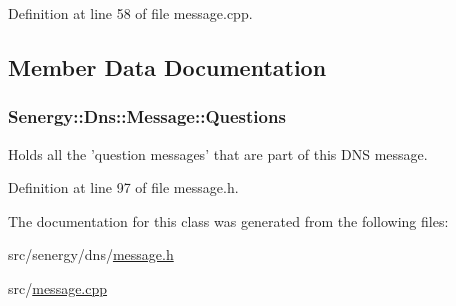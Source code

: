 Definition at line 58 of file message.\-cpp.



\subsection{Member Data Documentation}
\hypertarget{class_senergy_1_1_dns_1_1_message_a1e72009ea8004f0e8cc1ce0ea07f4ad1}{
\subsubsection[{Questions}]{ Senergy\-::\-Dns\-::\-Message\-::\-Questions}}\label{class_senergy_1_1_dns_1_1_message_a1e72009ea8004f0e8cc1ce0ea07f4ad1}


Holds all the 'question messages' that are part of this D\-N\-S message. 



Definition at line 97 of file message.\-h.



The documentation for this class was generated from the following files\-:\begin{DoxyCompactItemize}
\item 
src/senergy/dns/\hyperlink{message_8h}{message.\-h}\item 
src/\hyperlink{message_8cpp}{message.\-cpp}\end{DoxyCompactItemize}
